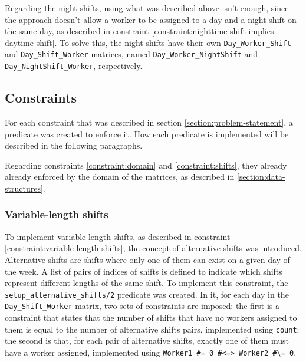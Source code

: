 \documentclass[conference]{IEEEtran}
\def\constraint#1{\vspace{4pt} {#1}}
\begin{document}
Regarding the night shifts, using what was described above isn't enough, since the approach doesn't allow a worker to be assigned to a day and a night shift on the same day, as described in constraint \ref{constraint:nighttime-shift-implies-daytime-shift}.
To solve this, the night shifts have their own \texttt{Day\_Worker\_Shift} and \texttt{Day\_Shift\_Worker} matrices, named \texttt{Day\_Worker\_NightShift} and \texttt{Day\_NightShift\_Worker}, respectively.

\subsection{Constraints}
\label{section:constraints}

For each constraint that was described in section \ref{section:problem-statement}, a predicate was created to enforce it. How each predicate is implemented will be described in the following paragraphs.

Regarding constraints \ref{constraint:domain} and \ref{constraint:shifts}, they already already enforced by the domain of the matrices, as described in \ref{section:data-structures}.

\constraint {
    \subsubsection*{Variable-length shifts}
    To implement variable-length shifts, as described in constraint \ref{constraint:variable-length-shifts}, the concept of alternative shifts was introduced. Alternative shifts are shifts where only one of them can exist on a given day of the week. A list of pairs of indices of shifts is defined to indicate which shifts represent different lengths of the same shift.
    To implement this constraint, the \texttt{setup\_alternative\_shifts/2} predicate was created. In it, for each day in the \texttt{Day\_Shift\_Worker} matrix, two sets of constraints are imposed: the first is a constraint that states that the number of shifts that have no workers assigned to them is equal to the number of alternative shifts pairs, implemented using \texttt{count}; the second is that, for each pair of alternative shifts, exactly one of them must have a worker assigned, implemented using \texttt{Worker1 \#= 0 \#<=> Worker2 \#\textbackslash= 0}.
}
\end{document}
